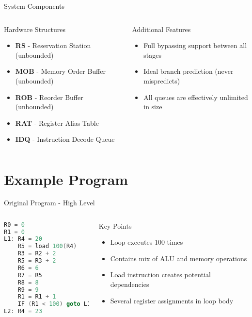 \documentclass[aspectratio=169,12pt]{beamer}
\begin{document}
\begin{frame}{System Components}
\begin{columns}
\begin{block}{Hardware Structures}
\begin{itemize}
    \item \textbf{RS} - Reservation Station (unbounded)
    \item \textbf{MOB} - Memory Order Buffer (unbounded)
    \item \textbf{ROB} - Reorder Buffer (unbounded)
    \item \textbf{RAT} - Register Alias Table
    \item \textbf{IDQ} - Instruction Decode Queue
\end{itemize}
\end{block}

\begin{block}{Additional Features}
\begin{itemize}
    \item Full bypassing support between all stages
    \item Ideal branch prediction (never mispredicts)
    \item All queues are effectively unlimited in size
\end{itemize}
\end{block}
\end{columns}
\end{frame}

\section{Example Program}

\begin{frame}[fragile]{Original Program - High Level}
\begin{columns}
\begin{lstlisting}[language=C]
R0 = 0
R1 = 0
L1: R4 = 20
    R5 = load 100(R4)
    R3 = R2 + 2
    R5 = R3 + 2
    R6 = 6
    R7 = R5
    R8 = 8
    R9 = 9
    R1 = R1 + 1
    IF (R1 < 100) goto L1
L2: R4 = 23
\end{lstlisting}

\begin{block}{Key Points}
\begin{itemize}
    \item Loop executes 100 times
    \item Contains mix of ALU and memory operations
    \item Load instruction creates potential dependencies
    \item Several register assignments in loop body
\end{itemize}
\end{block}
\end{columns}
\end{frame}
\end{document}
